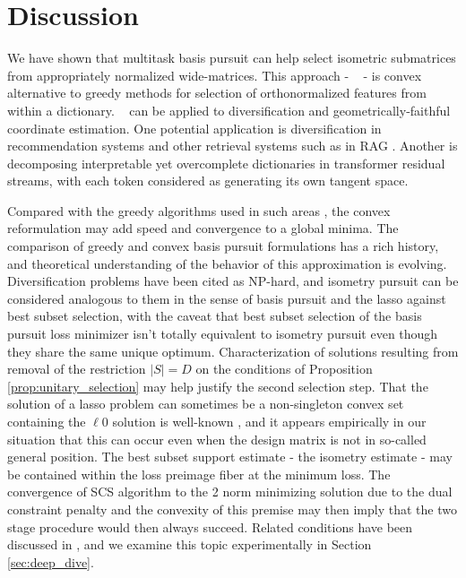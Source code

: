 \section{Discussion}
\label{sec:discussion}

We have shown that multitask basis pursuit can help select isometric submatrices from appropriately normalized wide-matrices.
This approach - \isometrypursuit~ - is convex alternative to greedy methods for selection of orthonormalized features from within a dictionary.
\isometrypursuit~ can be applied to diversification and geometrically-faithful coordinate estimation.
One potential application is diversification in recommendation systems \cite{Carbonell2017-gi, Wu2019-uk, Langchain} and other retrieval systems such as in RAG \cite{Gao2023-cn, Pickett2024-ad, In2024-um, Weiss2024-xm, Vectara}.
Another is decomposing interpretable yet overcomplete dictionaries in transformer residual streams, with each token considered as generating its own tangent space.

Compared with the greedy algorithms used in such areas \cite{Carbonell1998-ji, Barioni, Drosou, Qin2012-ok, KUNAVER2017154, Guo-shengbo, Abdool,Yu2016AGA,  Huang2024-wr, Pickett2024-ad}, the convex reformulation may add speed and convergence to a global minima.
The comparison of greedy \cite{Mallat93-wi, Mallat, Pati-93, Tropp05-ml} and convex \cite{Chen2001-hh, Tropp06-sg,Chen2006TheoreticalRO} basis pursuit formulations has a rich history, and theoretical understanding of the behavior of this approximation is evolving.
Diversification problems have been cited as NP-hard, and isometry pursuit can be considered analogous to them in the sense of basis pursuit and the lasso against best subset selection, with the caveat that best subset selection of the basis pursuit loss minimizer isn't totally equivalent to isometry pursuit even though they share the same unique optimum.
Characterization of solutions resulting from removal of the restriction $|S| = D$ on the conditions of Proposition \ref{prop:unitary_selection} may help justify the second selection step.
That the solution of a lasso problem can sometimes be a non-singleton convex set containing the $\ell 0 $ solution is well-known \cite{Osborne2000OnTL, DOSSAL2012117, Chrtien2011OnTG, Tibshirani2012TheLP, Ewald2017OnTD, Ali2018TheGL, Schneider2020-qt, Mishkin2022TheSP,Dupuis2019TheGO,Debarre2020OnTU,Everink2024TheGA}, and it appears empirically in our situation that this can occur even when the design matrix is not in so-called general position.
The best subset support estimate - the isometry estimate - may be contained within the loss preimage fiber at the minimum loss.
The convergence of SCS algorithm to the 2 norm minimizing solution due to the dual constraint penalty and the convexity of this premise may then imply that the two stage procedure would then always succeed.
Related conditions have been discussed in \cite{Donoho2006ForML, Mishkin2022TheSP}, and we examine this topic experimentally in Section \ref{sec:deep_dive}.


